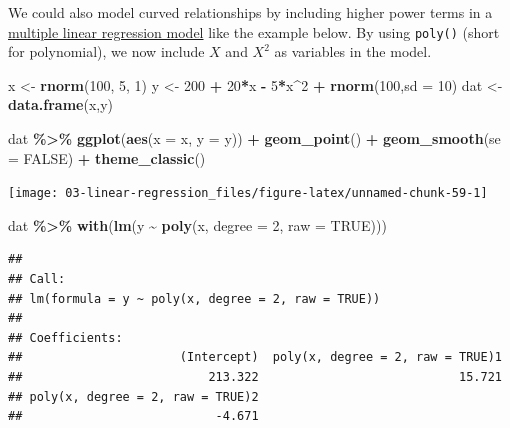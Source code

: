 \documentclass[
]{book}
\newenvironment{Shaded}{\begin{snugshade}}{\end{snugshade}}
\newcommand{\AttributeTok}[1]{\textcolor[rgb]{0.13,0.29,0.53}{#1}}
\newcommand{\ConstantTok}[1]{\textcolor[rgb]{0.56,0.35,0.01}{#1}}
\newcommand{\DecValTok}[1]{\textcolor[rgb]{0.00,0.00,0.81}{#1}}
\newcommand{\FunctionTok}[1]{\textcolor[rgb]{0.13,0.29,0.53}{\textbf{#1}}}
\newcommand{\NormalTok}[1]{#1}
\newcommand{\OtherTok}[1]{\textcolor[rgb]{0.56,0.35,0.01}{#1}}
\newcommand{\SpecialCharTok}[1]{\textcolor[rgb]{0.81,0.36,0.00}{\textbf{#1}}}
\begin{document}
We could also model curved relationships by including higher power terms in a \hyperref[multiple]{multiple linear regression model} like the example below. By using \texttt{poly()} (short for polynomial), we now include \(X\) and \(X^2\) as variables in the model.

\begin{Shaded}
\begin{Highlighting}[]
\NormalTok{x }\OtherTok{\textless{}{-}} \FunctionTok{rnorm}\NormalTok{(}\DecValTok{100}\NormalTok{, }\DecValTok{5}\NormalTok{, }\DecValTok{1}\NormalTok{)}
\NormalTok{y }\OtherTok{\textless{}{-}} \DecValTok{200} \SpecialCharTok{+} \DecValTok{20}\SpecialCharTok{*}\NormalTok{x }\SpecialCharTok{{-}} \DecValTok{5}\SpecialCharTok{*}\NormalTok{x}\SpecialCharTok{\^{}}\DecValTok{2} \SpecialCharTok{+} \FunctionTok{rnorm}\NormalTok{(}\DecValTok{100}\NormalTok{,}\AttributeTok{sd =} \DecValTok{10}\NormalTok{)}
\NormalTok{dat }\OtherTok{\textless{}{-}} \FunctionTok{data.frame}\NormalTok{(x,y)}

\NormalTok{dat }\SpecialCharTok{\%\textgreater{}\%}
    \FunctionTok{ggplot}\NormalTok{(}\FunctionTok{aes}\NormalTok{(}\AttributeTok{x =}\NormalTok{ x, }\AttributeTok{y =}\NormalTok{ y)) }\SpecialCharTok{+}
    \FunctionTok{geom\_point}\NormalTok{() }\SpecialCharTok{+} 
    \FunctionTok{geom\_smooth}\NormalTok{(}\AttributeTok{se =} \ConstantTok{FALSE}\NormalTok{) }\SpecialCharTok{+}
    \FunctionTok{theme\_classic}\NormalTok{()}
\end{Highlighting}
\end{Shaded}

\begin{center}\texttt{[image: 03-linear-regression\_files/figure-latex/unnamed-chunk-59-1]} \end{center}

\begin{Shaded}
\begin{Highlighting}[]
\NormalTok{dat }\SpecialCharTok{\%\textgreater{}\%}
  \FunctionTok{with}\NormalTok{(}\FunctionTok{lm}\NormalTok{(y }\SpecialCharTok{\textasciitilde{}} \FunctionTok{poly}\NormalTok{(x, }\AttributeTok{degree =} \DecValTok{2}\NormalTok{, }\AttributeTok{raw =} \ConstantTok{TRUE}\NormalTok{)))}
\end{Highlighting}
\end{Shaded}

\begin{verbatim}
## 
## Call:
## lm(formula = y ~ poly(x, degree = 2, raw = TRUE))
## 
## Coefficients:
##                      (Intercept)  poly(x, degree = 2, raw = TRUE)1  
##                          213.322                            15.721  
## poly(x, degree = 2, raw = TRUE)2  
##                           -4.671
\end{verbatim}
\end{document}

